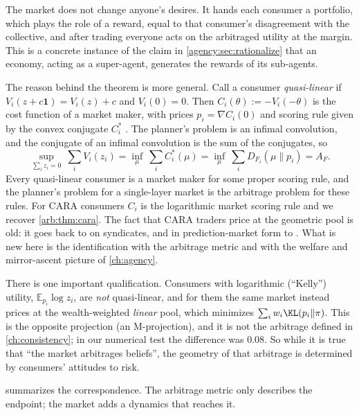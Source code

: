 \begin{draftblock}
The market does not change anyone's desires. It hands each consumer a portfolio, which plays the role of a reward, equal to that consumer's disagreement with the collective, and after trading everyone acts on the arbitraged utility at the margin. This is a concrete instance of the claim in \cref{agency:sec:rationalize} that an economy, acting as a super-agent, generates the rewards of its sub-agents.

The reason behind the theorem is more general. Call a consumer \emph{quasi-linear} if $V_i(z+c\mathbf1)=V_i(z)+c$ and $V_i(0)=0$. Then $C_i(\theta):=-V_i(-\theta)$ is the cost function of a market maker, with prices $p_i=\nabla C_i(0)$ and scoring rule given by the convex conjugate $C_i^*$ \citep{chenUtilityFrameworkBoundedloss2007}. The planner's problem is an infimal convolution, and the conjugate of an infimal convolution is the sum of the conjugates, so
\[
\sup_{\sum_iz_i=0}\ \sum_iV_i(z_i)=\inf_\mu\ \sum_iC_i^*(\mu)=\inf_\mu\ \sum_iD_{F_i}(\mu\|p_i)=A_F .
\]
Every quasi-linear consumer is a market maker for some proper scoring rule, and the planner's problem for a single-layer market is the arbitrage problem for these rules. For CARA consumers $C_i$ is the logarithmic market scoring rule and we recover \cref{arb:thm:cara}. The fact that CARA traders price at the geometric pool is old: it goes back to \citet{wilsonTheorySyndicates1968} on syndicates, and in prediction-market form to \citet{abernethyInformationAggregationExponential2014}. What is new here is the identification with the arbitrage metric and with the welfare and mirror-ascent picture of \cref{ch:agency}.

There is one important qualification. Consumers with logarithmic (``Kelly'') utility, $\mathbb E_{p_i}\log z_i$, are \emph{not} quasi-linear, and for them the same market instead prices at the wealth-weighted \emph{linear} pool, which minimizes $\sum_iw_i\KL(p_i\|\pi)$. This is the opposite projection (an M-projection), and it is not the arbitrage defined in \cref{ch:consistency}; in our numerical test the difference was $0.08$. So while it is true that ``the market arbitrages beliefs'', the geometry of that arbitrage is determined by consumers' attitudes to risk.

 summarizes the correspondence. The arbitrage metric only describes the endpoint; the market adds a dynamics that reaches it.


\end{draftblock}
